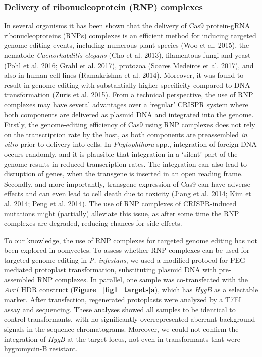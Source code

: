 \documentclass[onecolumn, 11pt,openany]{memoir}
\begin{document}
\begin{multicols}{2}
\subsubsection{Delivery of ribonucleoprotein (RNP) complexes}
In several organisms it has been shown that the delivery of Cas9 protein-gRNA ribonucleoproteins (RNPs) complexes is an efficient method for inducing targeted genome editing events, including numerous plant species (Woo et al. 2015), the nematode \textit{Caenorhabditis elegans} (Cho et al. 2013), filamentous fungi and yeast\textit{ }(Pohl et al. 2016; Grahl et al. 2017), protozoa (Soares Medeiros et al. 2017), and also in human cell lines (Ramakrishna et al. 2014). Moreover, it was found to result in genome editing with substantially higher specificity compared to DNA transformation (Zuris et al. 2015). From a technical perspective, the use of RNP complexes may have several advantages over a ‘regular’ CRISPR system where both components are delivered as plasmid DNA and integrated into the genome. Firstly, the genome-editing efficiency of Cas9 using RNP complexes does not rely on the transcription rate by the host, as both components are preassembled \textit{in vitro} prior to delivery into cells. In \textit{Phytophthora }spp., integration of foreign DNA occurs randomly, and it is plausible that integration in a ‘silent’ part of the genome results in reduced transcription rates. The integration can also lead to disruption of genes, when the transgene is inserted in an open reading frame. Secondly, and more importantly, transgene expression of Cas9 can have adverse effects and can even lead to cell death due to toxicity (Jiang et al. 2014; Kim et al. 2014; Peng et al. 2014). The use of RNP complexes of CRISPR-induced mutations might (partially) alleviate this issue, as after some time the RNP complexes are degraded, reducing chances for side effects.

To our knowledge, the use of RNP complexes for targeted genome editing has not been explored in oomycetes. To assess whether RNP complexes can be used for targeted genome editing in \textit{P. infestans}, we used a modified protocol for PEG-mediated protoplast transformation, substituting plasmid DNA with pre-assembled RNP complexes. In parallel, one sample was co-transfected with the \textit{Avr1} HDR construct (\textbf{Figure ~\ref{fig1_targets}a}), which has \textit{HygB} as a selectable marker. After transfection, regenerated protoplasts were analyzed by a T7EI assay and sequencing. These analyses showed all samples to be identical to control transformants, with no significantly overrepresented aberrant background signals in the sequence chromatograms. Moreover, we could not confirm the integration of \textit{HygB }at the target locus, not even in transformants that were hygromycin-B resistant.


\end{multicols}
\end{document}
